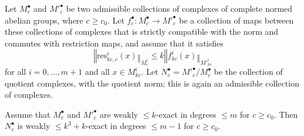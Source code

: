 \begin{proposition}
  \label{weaksnakelemma}
  \leanok
  Let $M^\bullet_c$ and $M'^\bullet_c$ be two admissible collections
  of complexes of complete normed abelian groups, where $c\geq c_0$.
  Let $f^\bullet_c: M^\bullet_c\to M'^\bullet_c$ be a collection of maps
  between these collections of complexes
  that is strictly compatible with the norm and commutes with restriction maps,
  and assume that it satisfies
  \[
  ‖\mathrm{res}^i_{kc,c}(x)‖_{M^i_c}\leq k‖f^i_{kc}(x)‖_{M'^i_{kc}}
  \]
  for all $i=0,\ldots,m+1$ and all $x\in M^i_{kc}$.
  Let $N^\bullet_c=M'^\bullet_c/M^\bullet_c$
  be the collection of quotient complexes, with the quotient norm;
  this is again an admissible collection of complexes.

  Assume that $M^\bullet_c$ and $M'^\bullet_c$ are weakly $\leq k$-exact in degrees $\leq m$ for $c\geq c_0$.
  Then $N^\bullet_c$ is weakly $\leq k^3+k$-exact in degrees $\leq m-1$ for $c\geq c_0$.
\end{proposition}

